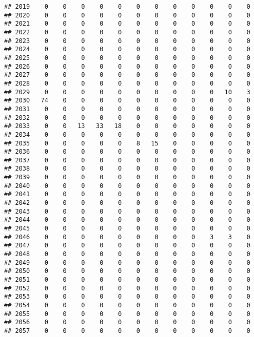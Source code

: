 \documentclass[]{article}
\begin{document}
\begin{verbatim}
## 2019    0    0    0    0    0    0    0    0    0    0    0    0
## 2020    0    0    0    0    0    0    0    0    0    0    0    0
## 2021    0    0    0    0    0    0    0    0    0    0    0    0
## 2022    0    0    0    0    0    0    0    0    0    0    0    0
## 2023    0    0    0    0    0    0    0    0    0    0    0    0
## 2024    0    0    0    0    0    0    0    0    0    0    0    0
## 2025    0    0    0    0    0    0    0    0    0    0    0    0
## 2026    0    0    0    0    0    0    0    0    0    0    0    0
## 2027    0    0    0    0    0    0    0    0    0    0    0    0
## 2028    0    0    0    0    0    0    0    0    0    0    0    0
## 2029    0    0    0    0    0    0    0    0    0    0   10    3
## 2030   74    0    0    0    0    0    0    0    0    0    0    0
## 2031    0    0    0    0    0    0    0    0    0    0    0    0
## 2032    0    0    0    0    0    0    0    0    0    0    0    0
## 2033    0    0   13   33   18    0    0    0    0    0    0    0
## 2034    0    0    0    0    0    0    0    0    0    0    0    0
## 2035    0    0    0    0    0    8   15    0    0    0    0    0
## 2036    0    0    0    0    0    0    0    0    0    0    0    0
## 2037    0    0    0    0    0    0    0    0    0    0    0    0
## 2038    0    0    0    0    0    0    0    0    0    0    0    0
## 2039    0    0    0    0    0    0    0    0    0    0    0    0
## 2040    0    0    0    0    0    0    0    0    0    0    0    0
## 2041    0    0    0    0    0    0    0    0    0    0    0    0
## 2042    0    0    0    0    0    0    0    0    0    0    0    0
## 2043    0    0    0    0    0    0    0    0    0    0    0    0
## 2044    0    0    0    0    0    0    0    0    0    0    0    0
## 2045    0    0    0    0    0    0    0    0    0    0    0    0
## 2046    0    0    0    0    0    0    0    0    0    3    3    0
## 2047    0    0    0    0    0    0    0    0    0    0    0    0
## 2048    0    0    0    0    0    0    0    0    0    0    0    0
## 2049    0    0    0    0    0    0    0    0    0    0    0    0
## 2050    0    0    0    0    0    0    0    0    0    0    0    0
## 2051    0    0    0    0    0    0    0    0    0    0    0    0
## 2052    0    0    0    0    0    0    0    0    0    0    0    0
## 2053    0    0    0    0    0    0    0    0    0    0    0    0
## 2054    0    0    0    0    0    0    0    0    0    0    0    0
## 2055    0    0    0    0    0    0    0    0    0    0    0    0
## 2056    0    0    0    0    0    0    0    0    0    0    0    0
## 2057    0    0    0    0    0    0    0    0    0    0    0    0

\end{verbatim}
\end{document}
